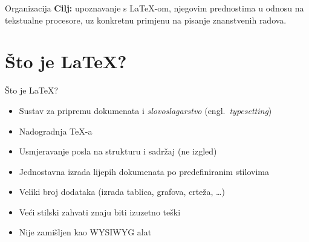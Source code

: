 \documentclass{beamer}
\begin{document}
\begin{frame}[t]{Organizacija}
\textbf{Cilj:} upoznavanje s \LaTeX-om, njegovim prednostima u odnosu na
tekstualne procesore, uz konkretnu primjenu na pisanje znanstvenih radova.

\begin{multicols}{2}
\tableofcontents
\end{multicols}
\end{frame}

\section{Što je \LaTeX{}?}
\begin{frame}[t]{Što je \LaTeX{}?}
\begin{itemize}
  \item Sustav za pripremu dokumenata i \emph{slovoslagarstvo} (engl.\ \emph{typesetting})
  \item Nadogradnja \TeX-a
  \item Usmjeravanje posla na strukturu i sadržaj (ne izgled)
  \item Jednostavna izrada lijepih dokumenata po predefiniranim stilovima
  \item Veliki broj dodataka (izrada tablica, grafova, crteža, \ldots)
  \item Veći stilski zahvati znaju biti izuzetno teški
  \item Nije zamišljen kao WYSIWYG alat
\end{itemize}
\end{frame}
\end{document}
